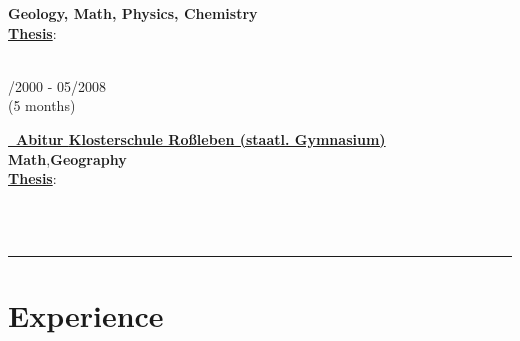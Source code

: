 \documentclass{article}
\newcommand{\spacingWork}{0.25cm}
\begin{document}
\begin{minipage}[t]{0.69\textwidth}
\begin{minipage}[t]{0.75\textwidth}
		\textbf{Geology, Math, Physics, Chemistry}\\
		\textbf{\underline{Thesis}}:\\
		 \href{https://www.dropbox.com/s/3kngo4hpb0c47ww/Bachelorarbeit.pdf?dl=0}{} \\	
		\end{minipage}
	\hfill
	\begin{minipage}[t]{0.2\textwidth}
			/2000 - 05/2008\\(5 months)
		\end{minipage}
		\hfill
		\begin{minipage}[t]{0.75\textwidth}
		\textbf{\href{https://www.dropbox.com/s/nsgmvy7o64xb9si/Abiturzeugnis.pdf?dl=0}{\color{pblue}\faGraduationCap~Abitur \hfill \href{https://www.klosterschule.de/}{\color{pblue}Klosterschule Roßleben (staatl. Gymnasium)}}}\\
		\textbf{Math},\textbf{Geography}\\
		\textbf{\underline{Thesis}}:\\
	\end{minipage}\\\\
	\hrule
\section*{\fontsize{18pt}{24pt}\selectfont \color{pblue} Experience}
	\begin{minipage}[t]{0.99\textwidth} 
%
%


\end{minipage}
\end{minipage}
\end{document}
